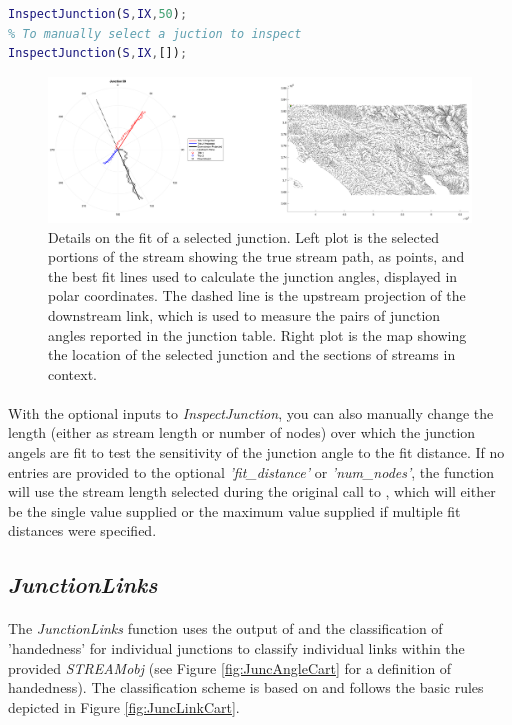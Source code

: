 \begin{lstlisting}[language=Matlab]
% To visually inspect the 50th junction in the output junction table
InspectJunction(S,IX,50);
% To manually select a juction to inspect
InspectJunction(S,IX,[]);
\end{lstlisting}

\begin{figure}[H]
	\centering
	\includegraphics[width=16.5cm]{PNGs/InspectJunct.png}
	\caption{Details on the fit of a selected junction. Left plot is the selected portions of the stream showing the true stream path, as points, and the best fit lines used to calculate the junction angles, displayed in polar coordinates. The dashed line is the upstream projection of the downstream link, which is used to measure the pairs of junction angles reported in the junction table. Right plot is the map showing the location of the selected junction and the sections of streams in context.} 
	\label{fig:InspectJunc}
\end{figure}

\paragraph{}With the optional inputs to \textit{InspectJunction}, you can also manually change the length (either as stream length or number of nodes) over which the junction angels are fit to test the sensitivity of the junction angle to the fit distance. If no entries are provided to the optional \textit{'fit\_distance'} or \textit{'num\_nodes'}, the function will use the stream length selected during the original call to , which will either be the single value supplied or the maximum value supplied if multiple fit distances were specified.

\subsection{\textit{JunctionLinks}} \label{sec:JLinks}
\paragraph{}The \textit{JunctionLinks} function uses the output of  and the classification of 'handedness' for individual junctions to classify individual links within the provided \textit{STREAMobj} (see Figure \ref{fig:JuncAngleCart} for a definition of handedness). The classification scheme is based on \cite{James1969} and follows the basic rules depicted in Figure \ref{fig:JuncLinkCart}.

